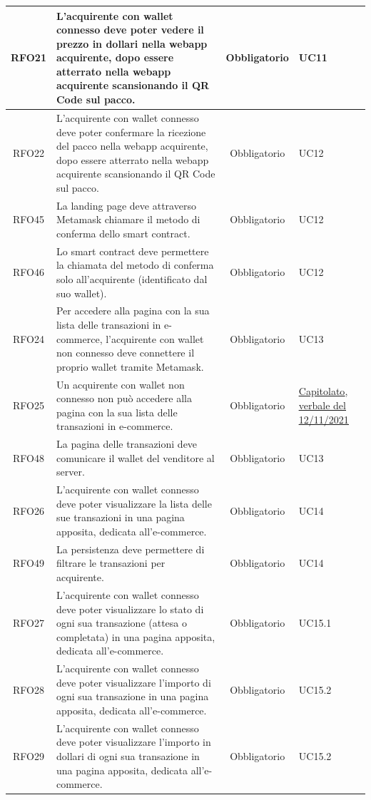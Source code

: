 \documentclass[a4paper, 12pt]{article}
\begin{document}
\begin{longtable}{|c|p{7cm}|c|p{4cm}|}
\hline
RFO21 & L'acquirente con wallet connesso deve poter vedere il prezzo in dollari nella webapp acquirente, dopo essere atterrato nella webapp acquirente scansionando il QR Code sul pacco. & Obbligatorio & UC11 \\
\hline
RFO22 & L'acquirente con wallet connesso deve poter confermare la ricezione del pacco nella webapp acquirente, dopo essere atterrato nella webapp acquirente scansionando il QR Code sul pacco. & Obbligatorio & UC12 \\
\hline
RFO45 & La landing page deve attraverso Metamask chiamare il metodo di conferma dello smart contract. & Obbligatorio & UC12 \\
\hline
RFO46 & Lo smart contract deve permettere la chiamata del metodo di conferma solo all'acquirente (identificato dal suo wallet). & Obbligatorio & UC12 \\
\hline
RFO24 & Per accedere alla pagina con la sua lista delle transazioni in e-commerce, l'acquirente con wallet non connesso deve connettere il proprio wallet tramite Metamask. & Obbligatorio & UC13 \\
\hline
RFO25 & Un acquirente con wallet non connesso non può accedere alla pagina con la sua lista delle transazioni in e-commerce. & Obbligatorio & \underline{\href{https://www.math.unipd.it/~tullio/IS-1/2021/Progetto/C2.pdf}{Capitolato}}, \underline{\href{https://github.com/iota97/WinningSoftwareSolution/blob/main/public/interni/verbali/2021_11_12_I.pdf}{verbale del 12/11/2021}} \\
\hline
RFO48 & La pagina delle transazioni deve comunicare il wallet del venditore al server. & Obbligatorio & UC13\\
\hline
RFO26 & L'acquirente con wallet connesso deve poter visualizzare la lista delle sue transazioni in una pagina apposita, dedicata all'e-commerce. & Obbligatorio & UC14 \\
\hline
RFO49 & La persistenza deve permettere di filtrare le transazioni per acquirente. & Obbligatorio & UC14 \\
\hline
RFO27 & L'acquirente con wallet connesso deve poter visualizzare lo stato di ogni sua transazione (attesa o completata) in una pagina apposita, dedicata all'e-commerce. & Obbligatorio & UC15.1 \\
\hline
RFO28 & L'acquirente con wallet connesso deve poter visualizzare l'importo di ogni sua transazione in una pagina apposita, dedicata all'e-commerce. & Obbligatorio & UC15.2 \\
\hline
RFO29 & L'acquirente con wallet connesso deve poter visualizzare l'importo in dollari di ogni sua transazione in una pagina apposita, dedicata all'e-commerce. & Obbligatorio & UC15.2 \\

\end{longtable}
\end{document}
